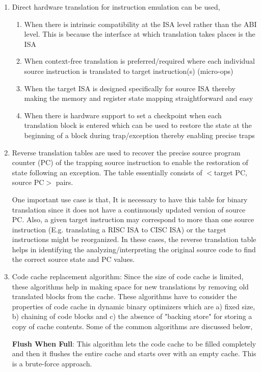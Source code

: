 \documentclass[11pt,a4paper,oneside]{article}
\begin{document}
\begin{enumerate}
		\item Direct hardware translation for instruction emulation can be used,
			\begin{enumerate}
				\item When there is intrinsic compatibility at the ISA level rather than the ABI level. This is because the interface at which translation takes places is the ISA
				\item When context-free translation is preferred/required where each individual source instruction is translated to target instruction(s) (micro-ops)
				\item When the target ISA is designed specifically for source ISA thereby making the memory and register state mapping straightforward and easy
				\item When there is hardware support to set a checkpoint when each translation block is entered which can be used to restore the state at the beginning of a block during trap/exception thereby enabling precise traps
			\end{enumerate}
		
		\item Reverse translation tables are used to recover the precise source program counter (PC) of the trapping source instruction to enable the restoration of state following an exception. The table essentially consists of $<$target PC, source PC$>$ pairs.
		
		One important use case is that, It is necessary to have this table for binary translation since it does not have a continuously updated version of source PC. Also, a given target instruction may correspond to more than one source instruction (E.g. translating a RISC ISA to CISC ISA) or the target instructions might be reorganized. In these cases, the reverse translation table helps in identifying the analyzing/interpreting the original source code to find the correct source state and PC values.
		
		\item Code cache replacement algorithm: Since the size of code cache is limited, these algorithms help in making space for new translations by removing old translated blocks from the cache. These algorithms have to consider the properties of code cache in dynamic binary optimizers which are a) fixed size, b) chaining of code blocks and c) the absence of "backing store" for storing a copy of cache contents. Some of the common algorithms are discussed below,
		
		\textbf{Flush When Full}: This algorithm lets the code cache to be filled completely and then it flushes the entire cache and starts over with an empty cache. This is a brute-force approach.
		

\end{enumerate}
\end{document}
